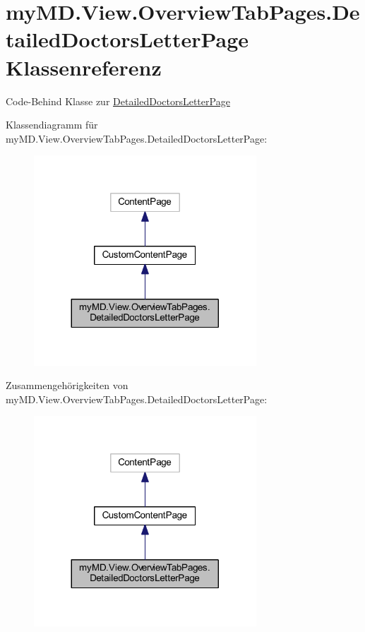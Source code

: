 \hypertarget{classmy_m_d_1_1_view_1_1_overview_tab_pages_1_1_detailed_doctors_letter_page}{}\section{my\+M\+D.\+View.\+Overview\+Tab\+Pages.\+Detailed\+Doctors\+Letter\+Page Klassenreferenz}
\label{classmy_m_d_1_1_view_1_1_overview_tab_pages_1_1_detailed_doctors_letter_page}


Code-\/\+Behind Klasse zur \mbox{\hyperlink{classmy_m_d_1_1_view_1_1_overview_tab_pages_1_1_detailed_doctors_letter_page}{Detailed\+Doctors\+Letter\+Page}}  




Klassendiagramm für my\+M\+D.\+View.\+Overview\+Tab\+Pages.\+Detailed\+Doctors\+Letter\+Page\+:\nopagebreak
\begin{figure}[H]
\begin{center}
\leavevmode
\includegraphics[width=236pt]{classmy_m_d_1_1_view_1_1_overview_tab_pages_1_1_detailed_doctors_letter_page__inherit__graph}
\end{center}
\end{figure}


Zusammengehörigkeiten von my\+M\+D.\+View.\+Overview\+Tab\+Pages.\+Detailed\+Doctors\+Letter\+Page\+:\nopagebreak
\begin{figure}[H]
\begin{center}
\leavevmode
\includegraphics[width=236pt]{classmy_m_d_1_1_view_1_1_overview_tab_pages_1_1_detailed_doctors_letter_page__coll__graph}
\end{center}
\end{figure}
